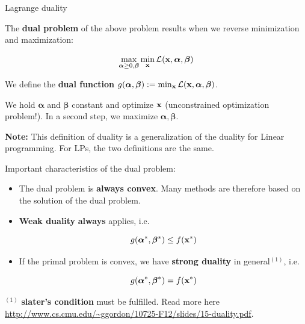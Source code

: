 \documentclass[11pt,compress,t,notes=noshow, xcolor=table]{beamer}
\begin{document}
\begin{vbframe}{Lagrange duality}

The \textbf{dual problem} of the above problem results when we reverse minimization and maximization:

$$
\max_{\bm{\alpha} \ge 0, \bm{\beta}} \min_{\mathbf{x}}  \mathcal{L}(\mathbf{x}, \bm{\alpha}, \bm{\beta})
$$

We define the \textbf{dual function} $g(\bm{\alpha}, \bm{\beta}) := \min_{\mathbf{x}}  \mathcal{L}(\mathbf{x}, \bm{\alpha}, \bm{\beta})$.

\lz

We hold $\bm{\alpha}$ and $\bm{\beta}$ constant and optimize $\mathbf{x}$ (unconstrained optimization problem!). In a second step, we maximize $\bm{\alpha}, \bm{\beta}$.

\lz

\textbf{Note:} This definition of duality is a generalization of the duality for Linear programming. For LPs, the two definitions are the same.


\framebreak

Important characteristics of the dual problem:

\begin{itemize}
\item The dual problem is \textbf{always convex}. Many methods are therefore based on the solution of the dual problem.
\item \textbf{Weak duality} \textbf{always} applies, i.e.

$$
g(\bm{\alpha}^*, \bm{\beta}^*) \le f(\mathbf{x}^*)
$$
\item If the primal problem is convex, we have \textbf{strong duality} in general$^{(1)}$, i.e.

$$
g(\bm{\alpha}^*, \bm{\beta}^*) = f(\mathbf{x}^*)
$$
\end{itemize}

\vfill

\begin{footnotesize}
$^{(1)}$ \textbf{slater's condition} must be fulfilled. Read more here \url{http://www.cs.cmu.edu/~ggordon/10725-F12/slides/15-duality.pdf}.
\end{footnotesize}

\end{vbframe}
\end{document}
